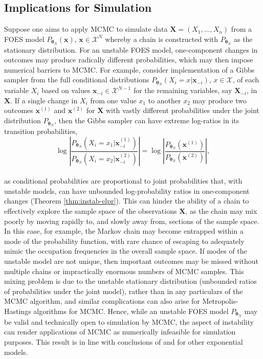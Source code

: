 \documentclass[numbib]{imamat}
\theoremstyle{theorem}
\theoremstyle{lemma}
\theoremstyle{example}
\theoremstyle{corollary}
\theoremstyle{definition}
\theoremstyle{remark}
\theoremstyle{approximation}
\theoremstyle{scheme}
\begin{document}
\hypertarget{mcmc}{%
\subsection{Implications for Simulation}\label{mcmc}}

Suppose one aims to apply MCMC to simulate data \(\boldsymbol X=(X_1,\ldots,X_n)\) from a FOES model \(P_{\boldsymbol \theta_N}(\boldsymbol x)\), \(\boldsymbol x \in\mathcal{X}^N\) whereby a chain is constructed with \(P_{\boldsymbol \theta_N}\) as the stationary distribution. For an unstable FOES model, one-component changes in outcomes may produce
radically different probabilities, which may then impose numerical barriers to MCMC. For example, consider implementation of a Gibbs sampler from the full conditional distributions \(P_{\boldsymbol \theta_N} (X_i = x| \boldsymbol x_{-i})\), \(x\in\mathcal{X}\), of each variable \(X_i\) based on values \(\boldsymbol x_{-i}\in \mathcal{X}^{N-1}\) for the remaining variables, say \(\boldsymbol X_{-i}\), in \(\boldsymbol X\). If a single change in \(X_i\) from one value \(x_1\) to another \(x_2\) may produce two outcomes \(\boldsymbol x^{(1)}\) and \(\boldsymbol x^{(2)}\) for \(\boldsymbol X\) with vastly different probabilities under the joint distribution \(P_{\boldsymbol \theta_N}\), then the Gibbs sampler can have extreme log-ratios in its transition probabilities,
\[
\log \left| \frac{P_{\boldsymbol \theta_N} (X_i =x_1 | \boldsymbol x^{(1)}_{-i})}{P_{\boldsymbol \theta_N} (X_i = x_2| \boldsymbol x^{(2)}_{-i}) } \right|=\log \left| \frac{P_{\boldsymbol \theta_N} ( \boldsymbol x^{(1)} )}{P_{\boldsymbol \theta_N} (  \boldsymbol x^{(2)} ) } \right|,
\]\\
as conditional probabilities are proportional to joint probabilities that, with unstable models, can have unbounded log-probability ratios in one-component changes (Theorem
\ref{thm:instab-elpr}). This can hinder the ability of a chain to effectively explore the sample space of the observations \(\boldsymbol X\), as the chain may mix poorly by moving rapidly to, and slowly away from, sections of the sample space. In this case, for example, the Markov chain may become entrapped within a mode of the probability function, with rare chance of escaping to adequately mimic the occupation frequencies in the overall sample space. If modes of the unstable model are not unique, then important outcomes may be missed without multiple chains or impractically enormous numbers of MCMC samples. This mixing problem is due to the unstable stationary distribution (unbounded ratios of probabilities under the joint model), rather than in any particulars of the MCMC algorithm, and similar complications can also arise for Metropolis-Hastings algorithms for MCMC. Hence, while an unstable FOES model \(P_{\boldsymbol \theta_N}\) may be valid and technically open to simulation by MCMC, the aspect of instability can render applications of MCMC as numerically infeasible for simulation purposes. This result is in line with conclusions of \citet{handcock2003assessing} and \citet{schweinberger2011instability} for other exponential models.
\end{document}
